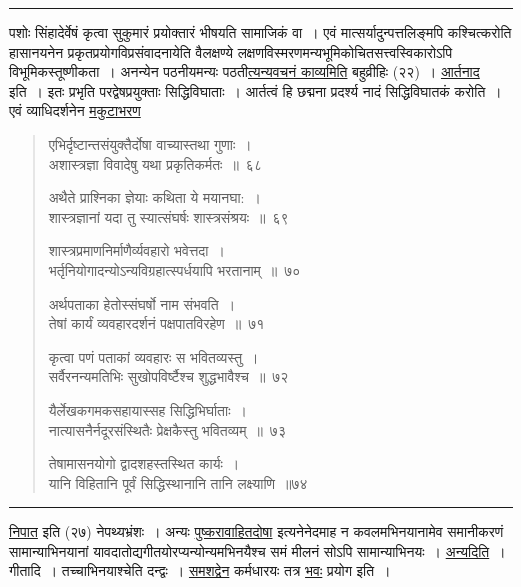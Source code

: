 \documentclass[11pt, openany]{book}
\begin{document}
\hrule

\vspace{2mm}
\noindent
पशोः सिंहादेर्वेषं कृत्वा सुकुमारं प्रयोक्तारं भीषयति सामाजिकं वा~। एवं मात्सर्यादुन्पत्तलिङ्मपि कश्चित्करोति हासानयनेन प्रकृतप्रयोगविप्रसंवादनायेति वैलक्षण्ये लक्षणविस्मरणमन्यभूमिकोचितसत्त्वस्विकारोऽपि विभूमिकस्तूष्णीकता~। अनन्येन पठनीयमन्यः पठती\underline{त्यन्यवचनं काव्यमिति} बहुव्रीहिः (२२)~। \underline{आर्तनाद} इति~। इतः प्रभृति परद्वेषप्रयुक्ताः सिद्धिविघाताः~। आर्तत्वं हि छद्मना प्रदर्श्य नादं सिद्धिविघातकं करोति~। एवं व्याधिदर्शनेन \underline{मकुटाभरण\textendash }


\newpage
\lfoot{}

\begin{quote}
{\na एभिर्दृष्टान्तसंयुक्तैर्दोषा वाच्यास्तथा गुणाः~।\\
अशास्त्रज्ञा विवादेषु यथा प्रकृतिकर्मतः~॥~६८

अथैते प्राश्निका ज्ञेयाः कथिता ये मयानघा:~।\\
शास्त्रज्ञानां यदा तु स्यात्संघर्षः शास्त्रसंश्रयः~॥~६९

शास्त्रप्रमाणनिर्माणैर्व्यवहारो भवेत्तदा~।\\
भर्तृनियोगादन्योऽन्यविग्रहात्स्पर्धयापि भरतानाम्~॥~७०

अर्थपताका हेतोस्संघर्षो नाम संभवति~।\\
तेषां कार्यं व्यवहारदर्शनं पक्षपातविरहेण~॥~७१

कृत्वा पणं पताकां व्यवहारः स भवितव्यस्तु~।\\
सर्वैरनन्यमतिभिः सुखोपविर्ष्टैश्च शुद्धभावैश्च~॥~७२

यैर्लेखकगमकसहायास्सह सिद्धिभिर्घाताः~।\\
नात्यासनैर्नदूरसंस्थितैः प्रेक्षकैस्तु भवितव्यम्~॥~७३

तेषामासनयोगो द्वादशहस्तस्थित कार्यः~।\\
यानि विहितानि पूर्वं सिद्धिस्थानानि तानि लक्ष्याणि~॥७४}
\end{quote}

\hrule

\vspace{2mm}
\noindent
\underline{निपात} इति (२७) नेपथ्यभ्रंशः~। अन्यः \underline{पुष्करावाहितदोषा} इत्यनेनेदमाह न कवलमभिनयानामेव समानीकरणं सामान्याभिनयानां यावदातोद्यगीतयोरप्यन्योन्यमभिनयैश्च समं मीलनं सोऽपि सामान्याभिनयः~। \underline{अन्यदिति}~। गीतादि~। तच्चाभिनयाश्चेति दन्द्वः~। \underline{समशद्वेन} कर्मधारयः तत्र \underline{भवः} प्रयोग इति~।

\newpage
\end{document}
